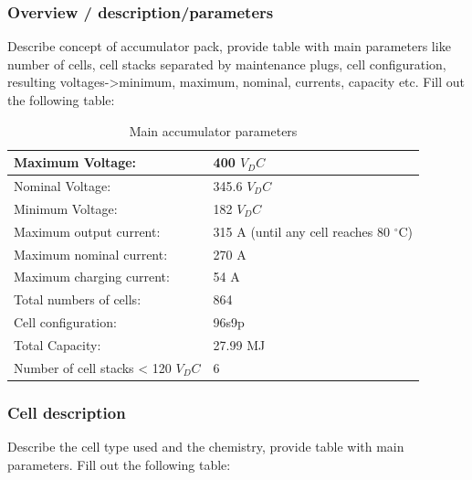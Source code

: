 \subsubsection{Overview / description/parameters}
Describe concept of accumulator pack, provide table with main parameters like number of cells, cell stacks separated by maintenance plugs, cell configuration, resulting voltages->minimum, maximum, nominal, currents, capacity etc.
Fill out the following table:

\begin{table}[H]
	\centering
	\caption{Main accumulator parameters}
	\begin{tabularx}{\textwidth}{|X|X|}
		\hline
		Maximum Voltage: & 400 $V_DC$ \\[\TableSize]
		\hline
		Nominal Voltage: & 345.6 $V_DC$ \\[\TableSize]
		\hline
		Minimum Voltage: & 182 $V_DC$ \\[\TableSize]
		\hline
		Maximum output current: & 315 A (until any cell reaches 80 $^\circ$C) \\[\TableSize]
		\hline
		Maximum nominal current: & 270 A \\[\TableSize]
		\hline
		Maximum charging current: & 54 A \\[\TableSize]
		\hline
		Total numbers of cells: & 864 \\[\TableSize]
		\hline
		Cell configuration: & 96s9p \\[\TableSize]
		\hline
		Total Capacity: & 27.99 MJ \\[\TableSize]
		\hline
		Number of cell stacks < 120 $V_DC$ & 6 \\[\TableSize]
		\hline
	\end{tabularx}%
	\label{tab:acc-main}%
\end{table}%

\subsubsection{Cell description}
Describe the cell type used and the chemistry, provide table with main parameters.
Fill out the following table:

